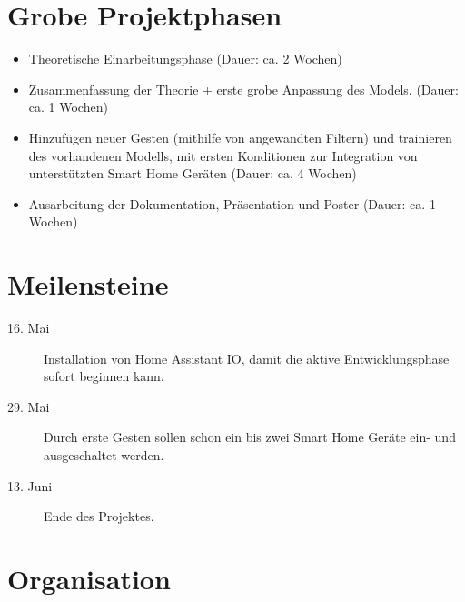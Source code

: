 \documentclass[aspectratio=169]{beamer}
\begin{document}
\section{Grobe Projektphasen}

\begin{frame}
  \begin{itemize}
    \item Theoretische Einarbeitungsphase (Dauer: ca. 2 Wochen)
    \item Zusammenfassung der Theorie + erste grobe Anpassung des Models. (Dauer: ca. 1 Wochen)
    \item Hinzufügen neuer Gesten (mithilfe von angewandten Filtern) und trainieren des vorhandenen Modells, mit ersten Konditionen zur Integration von unterstützten Smart Home Geräten (Dauer: ca. 4 Wochen)
    \item Ausarbeitung der Dokumentation, Präsentation und Poster (Dauer: ca. 1 Wochen)
  \end{itemize}
\end{frame}

\section{Meilensteine}

\begin{frame}
\begin{description}
  \item[16. Mai] Installation von Home Assistant IO, damit die aktive Entwicklungsphase sofort beginnen kann.
  \item[29. Mai] Durch erste Gesten sollen schon ein bis zwei Smart Home Geräte ein- und ausgeschaltet werden.
  \item[13. Juni] Ende des Projektes.
\end{description}
\end{frame}

\section{Organisation}
\end{document}
